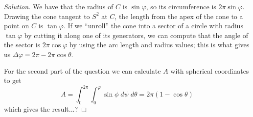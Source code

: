 \documentclass[10pt]{scrartcl}
\providecommand{\dif}{\;d}
\newenvironment{soln}{\begin{proof}[Solution]}{\end{proof}}
\begin{document}
\begin{soln}
	We have that the radius of $C$ is $\sin\varphi$, so its circumference is
	$2\pi\sin\varphi$. Drawing the cone tangent to $S^2$ at $C$,
	the length from the apex of the cone to a point on $C$ is $\tan\varphi$.
	If we ``unroll'' the cone into a sector of a circle
	with radius $\tan\varphi$ by cutting it along one of its generators,
	we can compute that the angle of the sector is $2\pi\cos\varphi$
	by using the arc length and radius values;
	this is what gives us $\Delta\varphi = 2\pi - 2\pi\cos\theta$.
	
	For the second part of the question we can calculate $A$
	with spherical coordinates to get
	\[A = \int_0^{2\pi}\int_0^\varphi \sin\phi\dif\psi\dif\theta
	= 2\pi(1 - \cos\theta)\]
	which gives the result...?
\end{soln}
\end{document}
